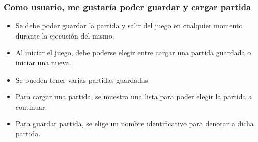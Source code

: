 \documentclass{article}
\begin{document}
\subsubsection*{Como usuario, me gustaría poder guardar y cargar partida}
\begin{itemize}
\item Se debe poder guardar la partida y salir del juego en cualquier momento durante la ejecución del mismo.
\item Al iniciar el juego, debe poderse elegir entre cargar una partida guardada o iniciar una nueva.
\item Se pueden tener varias partidas guardadas
\item Para cargar una partida, se muestra una lista para poder elegir la partida a continuar.
\item Para guardar partida, se elige un nombre identificativo para denotar a dicha partida.
\end{itemize}
\end{document}
